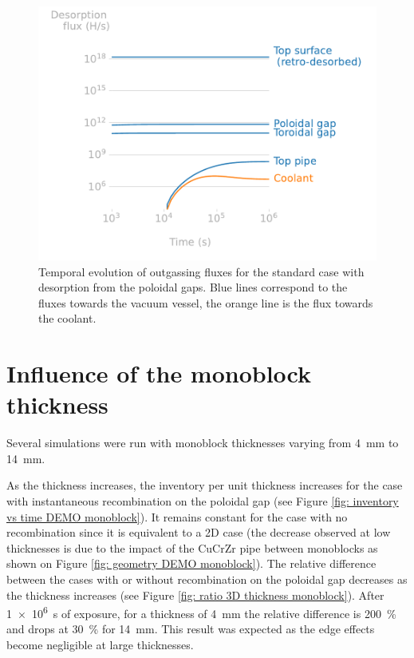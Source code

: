 \begin{figure} [h]
    \centering
    \includegraphics[width=\linewidth]{Figures/Chapter3/monoblocks/3D_monoblocks/desorption_flux_standard_case.pdf}
    \caption{Temporal evolution of outgassing fluxes for the standard case with desorption from the poloidal gaps. Blue lines correspond to the fluxes towards the vacuum vessel, the orange line is the flux towards the coolant.}
    \label{fig: fluxes DEMO monoblock}
\end{figure}

\section{Influence of the monoblock thickness}

Several simulations were run with monoblock thicknesses varying from \SI{4}{mm} to \SI{14}{mm}.

As the thickness increases, the inventory per unit thickness increases for the case with instantaneous recombination on the poloidal gap (see Figure \ref{fig: inventory vs time DEMO monoblock}).
It remains constant for the case with no recombination since it is equivalent to a 2D case (the decrease observed at low thicknesses is due to the impact of the CuCrZr pipe between monoblocks as shown on Figure \ref{fig: geometry DEMO monoblock}).
The relative difference between the cases with or without recombination on the poloidal gap decreases as the thickness increases (see Figure \ref{fig: ratio 3D thickness monoblock}).
After \SI{1e6}{s} of exposure, for a thickness of \SI{4}{mm} the relative difference is \SI{200}{\%} and drops at \SI{30}{\%} for \SI{14}{mm}.
This result was expected as the edge effects become negligible at large thicknesses.

